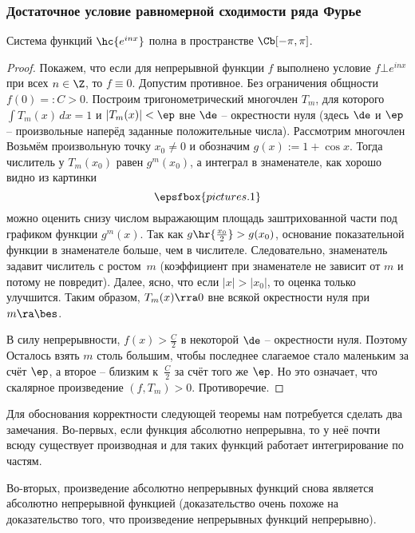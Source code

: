 \documentclass[a4paper]{article}
\newcommand{\dx}{\,dx}
\begin{document}
\subsubsection{Достаточное условие равномерной сходимости ряда Фурье}

\begin{stm}
Система функций $\hc{e^{inx}}$ полна в пространстве $\Cb[-\pi,\pi]$.
\end{stm}
\begin{proof}
Покажем, что если для непрерывной функции $f$ выполнено условие $f \bot e^{inx}$ при всех $n \in \Z$,
то $f \equiv 0$. Допустим противное. Без ограничения общности $f(0) =: C > 0$. Построим тригонометрический
многочлен $T_m$, для которого $\int T_m(x)\dx  = 1$ и $|T_m(x)| < \ep$ вне $\de$ -- окрестности нуля
(здесь $\de$ и $\ep$ -- произвольные наперёд заданные положительные числа). Рассмотрим многочлен
\eqn{T_m(x) := \frac{(1 + \cos x)^m}{\int (1+ \cos x)^m\dx}.}
Возьмём произвольную точку $x_0 \neq 0$ и обозначим $g(x) := 1 + \cos x$.
Тогда числитель у $T_m(x_0)$ равен $g^m(x_0)$, а интеграл в знаменателе, как хорошо видно из картинки
$$\epsfbox{pictures.1}$$
можно оценить снизу числом
выражающим площадь заштрихованной части под графиком функции $g^m(x)$.
Так как $g\hr{\frac{x_0}{2}} > g(x_0)$, основание показательной функции в знаменателе больше,
чем в числителе. Следовательно, знаменатель задавит числитель с ростом~$m$ (коэффициент
при знаменателе не зависит от $m$ и потому не повредит). Далее, ясно, что если
$|x| > |x_0|$, то оценка только улучшится. Таким образом, $T_m(x) \rra 0$ вне всякой
окрестности нуля при $m \ra \bes$.

В силу непрерывности, $f(x) > \frac{C}{2}$ в некоторой $\de$ -- окрестности нуля. Поэтому
\eqn{\int f(x) T_m(x)\dx \ge (1-\al)\cdot \frac{C}{2} - \al\cdot \hn{f}_\Cb, \quad \al := 2\ep(\pi-\de).}
Осталось взять $m$ столь большим, чтобы последнее слагаемое стало маленьким
за счёт $\ep$, а второе -- близким к~$\frac C2$ за счёт того же $\ep$.
Но это означает, что скалярное произведение $(f, T_m) > 0$. Противоречие.
\end{proof}

Для обоснования корректности следующей теоремы нам потребуется сделать два замечания.
Во-первых, если функция абсолютно непрерывна, то у неё почти всюду существует производная
и для таких функций работает интегрирование по частям.

Во-вторых, произведение абсолютно непрерывных функций снова является абсолютно непрерывной
функцией (доказательство очень похоже на доказательство того, что произведение непрерывных функций
непрерывно).
\end{document}
